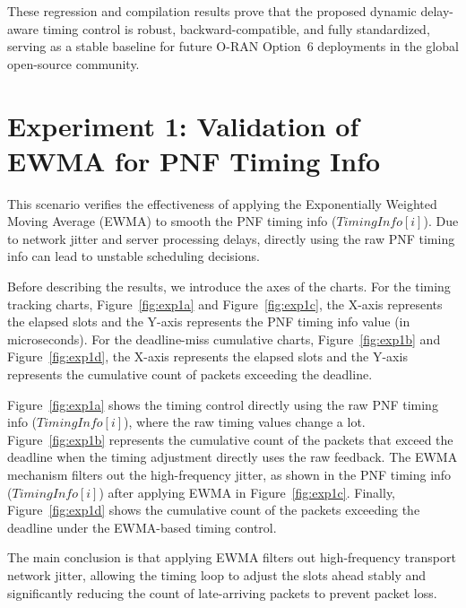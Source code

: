 \documentclass[../my_ntust_thesis.tex]{subfiles}
\begin{document}
These regression and compilation results prove that the proposed dynamic delay-aware timing control is robust, backward-compatible, and fully standardized, serving as a stable baseline for future O-RAN Option~6 deployments in the global open-source community.

\section{Experiment 1: Validation of EWMA for PNF Timing Info}
\label{subsec:scenario_1}

This scenario verifies the effectiveness of applying the Exponentially Weighted Moving Average (EWMA) to smooth the PNF timing info ($\mathit{TimingInfo}[i]$). Due to network jitter and server processing delays, directly using the raw PNF timing info can lead to unstable scheduling decisions. 

Before describing the results, we introduce the axes of the charts. For the timing tracking charts, Figure~\ref{fig:exp1a} and Figure~\ref{fig:exp1c}, the X-axis represents the elapsed slots and the Y-axis represents the PNF timing info value (in microseconds). For the deadline-miss cumulative charts, Figure~\ref{fig:exp1b} and Figure~\ref{fig:exp1d}, the X-axis represents the elapsed slots and the Y-axis represents the cumulative count of packets exceeding the deadline.

Figure~\ref{fig:exp1a} shows the timing control directly using the raw PNF timing info ($\mathit{TimingInfo}[i]$), where the raw timing values change a lot. Figure~\ref{fig:exp1b} represents the cumulative count of the packets that exceed the deadline when the timing adjustment directly uses the raw feedback. The EWMA mechanism filters out the high-frequency jitter, as shown in the PNF timing info ($\mathit{TimingInfo}[i]$) after applying EWMA in Figure~\ref{fig:exp1c}. Finally, Figure~\ref{fig:exp1d} shows the cumulative count of the packets exceeding the deadline under the EWMA-based timing control. 

The main conclusion is that applying EWMA filters out high-frequency transport network jitter, allowing the timing loop to adjust the slots ahead stably and significantly reducing the count of late-arriving packets to prevent packet loss.
\end{document}
